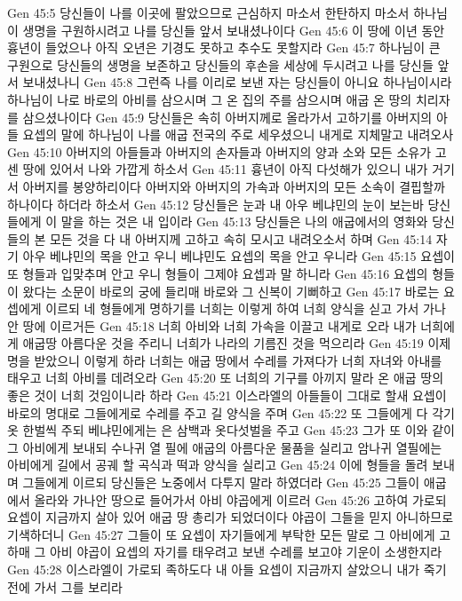 Gen 45:5  당신들이 나를 이곳에 팔았으므로 근심하지 마소서 한탄하지 마소서 하나님이 생명을 구원하시려고 나를 당신들 앞서 보내셨나이다
Gen 45:6  이 땅에 이년 동안 흉년이 들었으나 아직 오년은 기경도 못하고 추수도 못할지라
Gen 45:7  하나님이 큰 구원으로 당신들의 생명을 보존하고 당신들의 후손을 세상에 두시려고 나를 당신들 앞서 보내셨나니
Gen 45:8  그런즉 나를 이리로 보낸 자는 당신들이 아니요 하나님이시라 하나님이 나로 바로의 아비를 삼으시며 그 온 집의 주를 삼으시며 애굽 온 땅의 치리자를 삼으셨나이다
Gen 45:9  당신들은 속히 아버지께로 올라가서 고하기를 아버지의 아들 요셉의 말에 하나님이 나를 애굽 전국의 주로 세우셨으니 내게로 지체말고 내려오사
Gen 45:10  아버지의 아들들과 아버지의 손자들과 아버지의 양과 소와 모든 소유가 고센 땅에 있어서 나와 가깝게 하소서
Gen 45:11  흉년이 아직 다섯해가 있으니 내가 거기서 아버지를 봉양하리이다 아버지와 아버지의 가속과 아버지의 모든 소속이 결핍할까 하나이다 하더라 하소서
Gen 45:12  당신들은 눈과 내 아우 베냐민의 눈이 보는바 당신들에게 이 말을 하는 것은 내 입이라
Gen 45:13  당신들은 나의 애굽에서의 영화와 당신들의 본 모든 것을 다 내 아버지께 고하고 속히 모시고 내려오소서 하며
Gen 45:14  자기 아우 베냐민의 목을 안고 우니 베냐민도 요셉의 목을 안고 우니라
Gen 45:15  요셉이 또 형들과 입맞추며 안고 우니 형들이 그제야 요셉과 말 하니라
Gen 45:16  요셉의 형들이 왔다는 소문이 바로의 궁에 들리매 바로와 그 신복이 기뻐하고
Gen 45:17  바로는 요셉에게 이르되 네 형들에게 명하기를 너희는 이렇게 하여 너희 양식을 싣고 가서 가나안 땅에 이르거든
Gen 45:18  너희 아비와 너희 가속을 이끌고 내게로 오라 내가 너희에게 애굽땅 아름다운 것을 주리니 너희가 나라의 기름진 것을 먹으리라
Gen 45:19  이제 명을 받았으니 이렇게 하라 너희는 애굽 땅에서 수레를 가져다가 너희 자녀와 아내를 태우고 너희 아비를 데려오라
Gen 45:20  또 너희의 기구를 아끼지 말라 온 애굽 땅의 좋은 것이 너희 것임이니라 하라
Gen 45:21  이스라엘의 아들들이 그대로 할새 요셉이 바로의 명대로 그들에게로 수레를 주고 길 양식을 주며
Gen 45:22  또 그들에게 다 각기 옷 한벌씩 주되 베냐민에게는 은 삼백과 옷다섯벌을 주고
Gen 45:23  그가 또 이와 같이 그 아비에게 보내되 수나귀 열 필에 애굽의 아름다운 물품을 실리고 암나귀 열필에는 아비에게 길에서 공궤 할 곡식과 떡과 양식을 실리고
Gen 45:24  이에 형들을 돌려 보내며 그들에게 이르되 당신들은 노중에서 다투지 말라 하였더라
Gen 45:25  그들이 애굽에서 올라와 가나안 땅으로 들어가서 아비 야곱에게 이르러
Gen 45:26  고하여 가로되 요셉이 지금까지 살아 있어 애굽 땅 총리가 되었더이다 야곱이 그들을 믿지 아니하므로 기색하더니
Gen 45:27  그들이 또 요셉이 자기들에게 부탁한 모든 말로 그 아비에게 고하매 그 아비 야곱이 요셉의 자기를 태우려고 보낸 수레를 보고야 기운이 소생한지라
Gen 45:28  이스라엘이 가로되 족하도다 내 아들 요셉이 지금까지 살았으니 내가 죽기 전에 가서 그를 보리라
